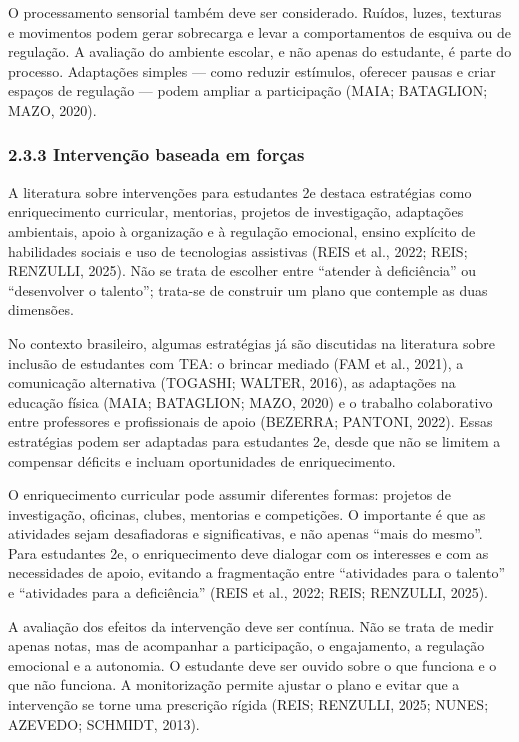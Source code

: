 O processamento sensorial também deve ser considerado. Ruídos, luzes,
texturas e movimentos podem gerar sobrecarga e levar a comportamentos de
esquiva ou de regulação. A avaliação do ambiente escolar, e não apenas
do estudante, é parte do processo. Adaptações simples --- como reduzir
estímulos, oferecer pausas e criar espaços de regulação --- podem
ampliar a participação (MAIA; BATAGLION; MAZO, 2020).

\subsubsection{2.3.3 Intervenção baseada em
forças}\label{intervenuxe7uxe3o-baseada-em-foruxe7as}

A literatura sobre intervenções para estudantes 2e destaca estratégias
como enriquecimento curricular, mentorias, projetos de investigação,
adaptações ambientais, apoio à organização e à regulação emocional,
ensino explícito de habilidades sociais e uso de tecnologias assistivas
(REIS et al., 2022; REIS; RENZULLI, 2025). Não se trata de escolher
entre ``atender à deficiência'' ou ``desenvolver o talento''; trata-se
de construir um plano que contemple as duas dimensões.

No contexto brasileiro, algumas estratégias já são discutidas na
literatura sobre inclusão de estudantes com TEA: o brincar mediado (FAM
et al., 2021), a comunicação alternativa (TOGASHI; WALTER, 2016), as
adaptações na educação física (MAIA; BATAGLION; MAZO, 2020) e o trabalho
colaborativo entre professores e profissionais de apoio (BEZERRA;
PANTONI, 2022). Essas estratégias podem ser adaptadas para estudantes
2e, desde que não se limitem a compensar déficits e incluam
oportunidades de enriquecimento.

O enriquecimento curricular pode assumir diferentes formas: projetos de
investigação, oficinas, clubes, mentorias e competições. O importante é
que as atividades sejam desafiadoras e significativas, e não apenas
``mais do mesmo''. Para estudantes 2e, o enriquecimento deve dialogar
com os interesses e com as necessidades de apoio, evitando a
fragmentação entre ``atividades para o talento'' e ``atividades para a
deficiência'' (REIS et al., 2022; REIS; RENZULLI, 2025).

A avaliação dos efeitos da intervenção deve ser contínua. Não se trata
de medir apenas notas, mas de acompanhar a participação, o engajamento,
a regulação emocional e a autonomia. O estudante deve ser ouvido sobre o
que funciona e o que não funciona. A monitorização permite ajustar o
plano e evitar que a intervenção se torne uma prescrição rígida (REIS;
RENZULLI, 2025; NUNES; AZEVEDO; SCHMIDT, 2013).

